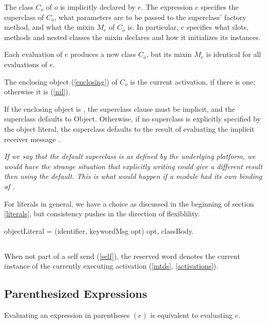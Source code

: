 \documentclass{article}
\newcommand{\code}[1]{{\sf #1}}
\begin{document}
The class $C_o$ of $o$ is implicitly declared by $e$. The expression $e$ specifies the superclass of $C_o$, what parameters are to be passed to the superclass' factory method, and what the mixin $M_e$ of $C_o$ is. In particular, $e$ specifies what slots, methods and nested classes the mixin declares and how it initializes its instances.

Each evaluation of $e$ produces a new class $C_o$, but its mixin $M_e$ is identical for all evaluations of $e$.

The enclosing object (\ref{enclosing}) of $C_o$  is the current activation,
if there is one; otherwise it is \NIL{} (\ref{nil}).

If the enclosing object is \NIL{}, the superclass clause must be implicit, and the superclass defaults to \code{Object}. Otherwise, if no superclass is explicitly specified by the object literal, the superclass defaults to the result of evaluating the implicit receiver message  . 

 {\it
If we say that the default superclass is  as defined by the underlying platform, we would have the strange situation that explicitly writing  could give a different result then using the default.
This is what would happen if  a module had its own binding of . 

For literals in general, we have a choice as discussed in the beginning of section \ref{literals}, but consistency pushes in the direction of flexiblility.
}

\begin{newspeak}
objectLiteral = (identifier, keywordMsg opt) opt,  classBody.
\end{newspeak}


\subsection{\SELF} 
\label{selfKw}

When not part of a self send (\ref{self}), the reserved word  \SELF{} denotes  the current instance of the currently executing activation (\ref{mtds}, \ref{activations}). 

\subsection{Parenthesized Expressions}
\label{parens}

Evaluating an expression in parentheses $(e)$ is equivalent to evaluating $e$.
\end{document}
